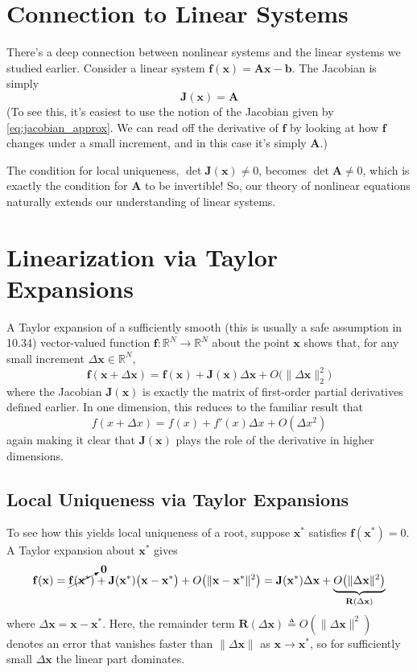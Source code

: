 \section{Connection to Linear Systems}

There's a deep connection between nonlinear systems and the linear systems we studied earlier. Consider a linear system $\mathbf{f}(\mathbf{x}) = \mathbf{A}\mathbf{x} - \mathbf{b}$. The Jacobian is simply
\begin{equation}
\mathbf{J}(\mathbf{x}) = \mathbf{A}
\end{equation}
(To see this, it's easiest to use the notion of the Jacobian given by \autoref{eq:jacobian_approx}. We can read off the derivative of $\mathbf f$ by looking at how $\mathbf f$ changes under a small increment, and in this case it's simply $\mathbf A$.)

The condition for local uniqueness, $\det \mathbf{J}(\mathbf{x}) \neq 0$, becomes $\det \mathbf{A} \neq 0$, which is exactly the condition for $\mathbf{A}$ to be invertible! So, our theory of nonlinear equations naturally extends our understanding of linear systems.

\section{Linearization via Taylor Expansions}
A Taylor expansion of a sufficiently smooth (this is usually a safe assumption in 10.34) vector-valued function 
\(\mathbf f\colon\mathbb R^N\to\mathbb R^N\) about the point \(\mathbf x\) shows that, for any small increment \(\Delta\mathbf x\in\mathbb R^N\),
\[
\mathbf f(\mathbf x + \Delta\mathbf x) = \mathbf f(\mathbf x) +\mathbf{J}(\mathbf x) \Delta\mathbf x +O\bigl(\|\Delta\mathbf x\|_2^2\bigr)
\]
where the Jacobian \(\mathbf{J}(\mathbf x)\) is exactly the matrix of first-order partial derivatives defined earlier.  In one dimension, this reduces to the familiar result that
\[
f(x+\Delta x)=f(x)+f'(x)\Delta x+ O(\Delta x^2)
\]
again making it clear that \(\mathbf{J}(\mathbf x)\) plays the role of the derivative in higher dimensions.

\subsection{Local Uniqueness via Taylor Expansions}
To see how this yields local uniqueness of a root, suppose \(\mathbf x^*\) satisfies \(\mathbf f(\mathbf x^*)=0\).  A Taylor expansion about \(\mathbf x^*\) gives
\[
\mathbf f(\mathbf x)
=\cancelto{\mathbf0}{\mathbf f(\mathbf x^*)}
+\mathbf J(\mathbf x^*)\bigl(\mathbf x-\mathbf x^*\bigr)
+ O\bigl(\|\mathbf x-\mathbf x^*\|^2\bigr)
=\mathbf J(\mathbf x^*) \Delta\mathbf x
+\underbrace{O\bigl(\|\Delta\mathbf x\|^2\bigr)}_{\mathbf{R}(\Delta\mathbf x)}
\]
where \(\Delta\mathbf x=\mathbf x-\mathbf x^*\).  Here, the remainder term \(\mathbf{R}(\Delta\mathbf x) \triangleq O(\|\Delta\mathbf x\|^2)\) denotes an error that vanishes faster than \(\|\Delta\mathbf x\|\) as \(\mathbf x\to\mathbf x^*\), so for sufficiently small \(\Delta\mathbf x\) the linear part dominates.


